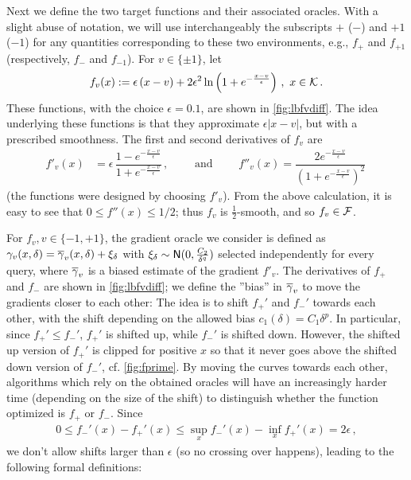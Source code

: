 Next we define the two target functions and their associated oracles. With a slight abuse of notation, we will use interchangeably the subscripts $+$ ($-$) and $+1$ ($-1$) for any quantities corresponding to these two environments, e.g., $f_+$ and $f_{+1}$ (respectively, $f_-$ and $f_{-1}$).
For $v \in \{\pm 1\}$, let
\begin{align}\label{eq:fvdef}
f_v(x) :=  \epsilon\left( x-v\right)+2\epsilon^2 \ln\left(1+e^{-\frac{x-v}{\epsilon}}  \right)\,,
\,\, x \in \mathcal{K}\,.
\end{align}
These functions, with the choice $\epsilon=0.1$, are shown in \cref{fig:lbfvdiff}. 
The idea underlying these functions is that they approximate $\epsilon|x-v|$, but with a prescribed smoothness.
The first and second derivatives of $f_v$ are
\begin{align*}
f'_v(x) &=\epsilon\, \dfrac{1-e^{-\frac{x-v}{\epsilon}}}{1+e^{-\frac{x-v}{\epsilon}}} \,, \qquad \text{ and } \qquad
f''_v(x) = \dfrac{2e^{-\frac{x-v}{\epsilon}} }{\left(  1+e^{-\frac{x-v}{\epsilon}}\right)^2}  \,
\end{align*}
(the functions were designed by choosing $f'_v$).
From the above calculation, it is easy to see that $0 \le f''(x) \le 1/2$; thus $f_v$ is $\frac{1}{2}$-smooth, and so $f_v\in \mathcal{F}$.

For $f_v, v\in\{-1,+1\}$, the gradient oracle we consider is defined as $\gamma_v(x,\delta)=\overline{\gamma}_v(x,\delta)+\xi_\delta$ with $\xi_\delta \sim \mathsf{N}(0,\frac{C_2}{\delta^q})$ selected independently for every query, where $\overline{\gamma}_v$ is a biased estimate of the gradient $f'_v$. 
The derivatives of $f_+$ and $f_-$ are shown in \cref{fig:lbfvdiff}; we define the ''bias'' in $\overline{\gamma}_v$ to move the gradients closer to each other:
The idea is to shift $f_+'$ and $f_-'$ towards each other, with the shift depending on the allowed bias $c_1(\delta) = C_1\delta^p$.
In particular, since $f_+'\le f_-'$, $f_+'$ is shifted up, while $f_-'$ is shifted down. 
However, the shifted up version of $f_+'$ is clipped for positive $x$ so that it never goes above the 
shifted down version of $f_-'$, cf. \cref{fig:fprime}.
 By moving the curves towards each other, algorithms which rely on the obtained oracles
will have an increasingly harder time (depending on the size of the shift) to distinguish whether the function optimized is $f_+$ or $f_-$. Since
\begin{align*}
0\le f_-'(x) - f_+'(x) \le \sup_{x} f_-'(x) - \inf_x f_+'(x) = 2\epsilon\,,
\end{align*}
we don't allow shifts larger than $\epsilon$ (so no crossing over happens), leading to the following formal definitions:


